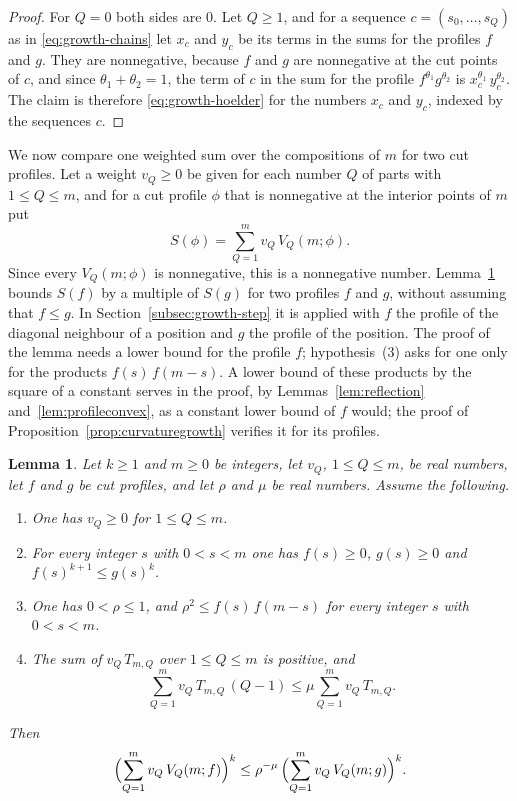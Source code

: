 \documentclass{amsart}
\makeatletter
\newtheorem{lemma}[theorem]{Lemma}
\theoremstyle{definition}
\theoremstyle{remark}
\numberwithin{equation}{section}
\def\subsection{\@startsection{subsection}{2}\z@{.5\linespacing\@plus.7\linespacing}{-.5em}{\normalfont\bfseries\boldmath}}
\makeatother
\begin{document}
\begin{proof}
For $Q=0$ both sides are $0$. Let $Q\ge1$, and for a sequence
$c=(s_0,\dots,s_Q)$ as in \eqref{eq:growth-chains} let $x_c$ and $y_c$ be
its terms in the sums for the profiles $f$ and $g$. They are nonnegative,
because $f$ and $g$ are nonnegative at the cut points of $c$, and since
$\theta_1+\theta_2=1$, the term of $c$ in the sum for the profile
$f^{\theta_1}g^{\theta_2}$ is $x_c^{\theta_1}\,y_c^{\theta_2}$. The claim
is therefore \eqref{eq:growth-hoelder} for the numbers $x_c$ and $y_c$,
indexed by the sequences $c$.
\end{proof}

\subsection{The comparison of two profiles}\label{subsec:growth-comparison}

We now compare one weighted sum over the compositions of $m$ for two cut
profiles. Let a weight $v_Q\ge0$ be given for each number $Q$ of parts with
$1\le Q\le m$, and for a cut profile $\phi$ that is nonnegative at the
interior points of $m$ put
\begin{equation}\label{eq:growth-sum}
S(\phi)=\sum_{Q=1}^{m}v_Q\,V_Q(m;\phi).
\end{equation}
Since every $V_Q(m;\phi)$ is nonnegative, this is a nonnegative number.
Lemma~\ref{lem:profilecomparison} bounds $S(f)$ by a multiple of $S(g)$ for
two profiles $f$ and $g$, without assuming that $f\le g$. In
Section~\ref{subsec:growth-step} it is applied with $f$ the profile of the
diagonal neighbour of a position and $g$ the profile of the position.
The proof of the lemma needs a lower bound for the profile $f$;
hypothesis~(3) asks for one only for the products $f(s)\,f(m-s)$. A lower
bound of these products by the square of a constant serves in the proof, by
Lemmas~\ref{lem:reflection} and~\ref{lem:profileconvex}, as a constant
lower bound of $f$ would; the proof of
Proposition~\ref{prop:curvaturegrowth} verifies it for its profiles.

\begin{lemma}\label{lem:profilecomparison}
Let $k\ge1$ and $m\ge0$ be integers, let $v_Q$, $1\le Q\le m$, be real
numbers, let $f$ and $g$ be cut profiles, and let $\rho$ and $\mu$ be real
numbers. Assume the following.
\begin{enumerate}
\item One has $v_Q\ge0$ for $1\le Q\le m$.
\item For every integer $s$ with $0<s<m$ one has $f(s)\ge0$, $g(s)\ge0$ and
$f(s)^{k+1}\le g(s)^{k}$.
\item One has $0<\rho\le1$, and $\rho^2\le f(s)\,f(m-s)$ for every integer
$s$ with $0<s<m$.
\item The sum of $v_Q\,T_{m,Q}$ over $1\le Q\le m$ is positive,
and
\[
\sum_{Q=1}^{m}v_Q\,T_{m,Q}\,(Q-1)\le\mu\sum_{Q=1}^{m}v_Q\,T_{m,Q}.
\]
\end{enumerate}
Then
\[
\Bigl(\sum_{Q=1}^{m}v_Q\,V_Q(m;f)\Bigr)^{k}
\le\rho^{-\mu}\,\Bigl(\sum_{Q=1}^{m}v_Q\,V_Q(m;g)\Bigr)^{k}.
\]
\end{lemma}
\end{document}
